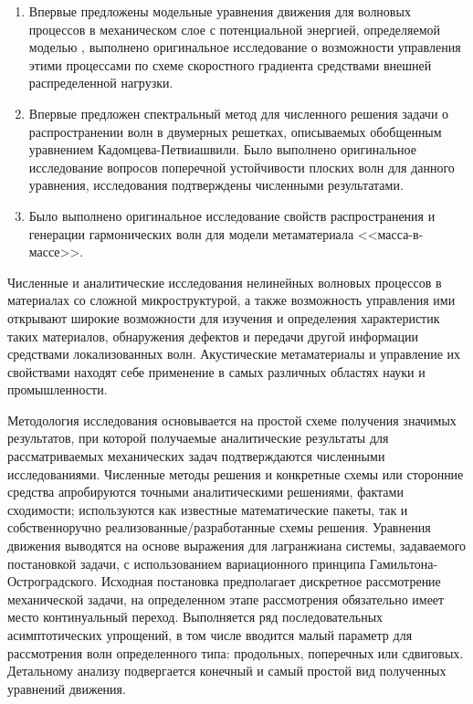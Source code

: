 {\novelty}
\begin{enumerate}[beginpenalty=10000] %
  \item {Впервые предложены модельные уравнения движения для волновых процессов в механическом слое с потенциальной энергией, определяемой моделью \cite{bound_porsp17}, выполнено оригинальное исследование о возможности управления этими процессами по схеме скоростного градиента средствами внешней распределенной нагрузки. } 
  \item {Впервые предложен спектральный метод для численного решения задачи о распространении волн в двумерных решетках, описываемых обобщенным уравнением Кадомцева-Петвиашвили. Было выполнено оригинальное исследование вопросов поперечной устойчивости плоских волн для данного уравнения, исследования подтверждены численными результатами.  } 
  \item {Было выполнено оригинальное исследование свойств распространения и генерации гармонических волн для модели метаматериала <<масса-в-массе>>.} 
\end{enumerate}

{\influence}

Численные и аналитические исследования нелинейных волновых процессов в материалах со сложной микроструктурой, а также возможность управления ими открывают широкие возможности для изучения и определения характеристик таких материалов, обнаружения дефектов и передачи другой информации средствами локализованных волн. Акустические метаматериалы и управление их свойствами находят себе применение в самых различных областях науки и промышленности.


{\methods}

Методология исследования основывается на простой схеме получения значимых результатов, при которой получаемые аналитические результаты для рассматриваемых механических задач подтверждаются численными исследованиями. Численные методы решения и конкретные схемы или сторонние средства апробируются точными аналитическими решениями, фактами сходимости; используются как известные математические пакеты, так и собственноручно реализованные/разработанные схемы решения. Уравнения движения выводятся на основе выражения для лагранжиана системы, задаваемого постановкой задачи, с использованием вариационного принципа Гамильтона-Остроградского. Исходная постановка предполагает дискретное рассмотрение механической задачи, на определенном этапе рассмотрения обязательно имеет место континуальный переход. Выполняется ряд последовательных асимптотических упрощений, в том числе вводится малый параметр для рассмотрения волн определенного типа: продольных, поперечных или сдвиговых. Детальному анализу подвергается конечный и самый простой вид полученных уравнений движения.


